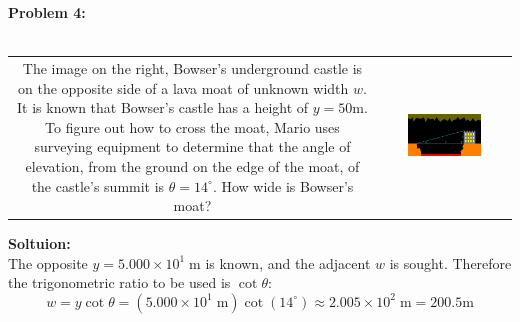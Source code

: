 \documentclass{article}
\newcommand{\dr}[1]{\textcolor{dark_red}{#1}}
\begin{document}
\pagebreak
\begin{framed}
\textbf{Problem 4:} ~~\\ ~~\\
\begin{tabular}{cc}
\parbox{0.4\textwidth}{
The image on the right, Bowser's underground castle is on the opposite side of a lava moat of unknown width \(w\). It is known that Bowser's castle has a height of \(y = 50\text{m}\). To figure out how to cross the moat, Mario uses surveying equipment to determine that the angle of elevation, from the ground on the edge of the moat, of the castle's summit is \(\theta = 14^\circ\). How wide is Bowser's moat?  
} & \parbox{0.6\textwidth}{
\includegraphics[width = 0.6\textwidth]{gorge_width}
}
\end{tabular}
\dr{\textbf{Soltuion:} \\ 
The opposite \(y = 5.000 \times 10^1 \;\text{m}\) is known, and the adjacent \(w\) is sought. Therefore the trigonometric ratio to be used is \(\cot\theta\):
\[w = y\cot\theta = (5.000 \times 10^1 \;\text{m})\cot(14^\circ) \approx 2.005 \times 10^2 \;\text{m} = 200.5\text{m}\]
}
\end{framed}
\end{document}
